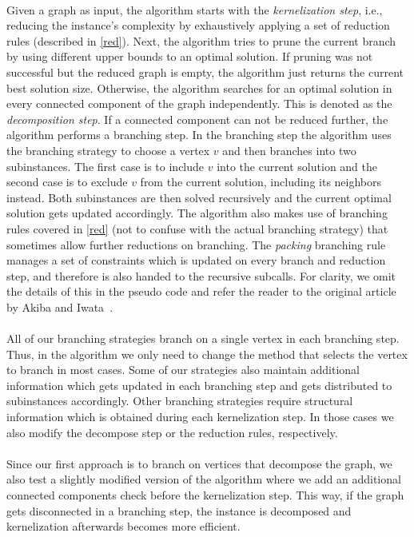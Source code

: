 \documentclass[12pt,a4paper,twoside]{scrartcl}
\numberwithin{equation}{section}
\begin{document}
\paragraph{}
Given a graph as input, the algorithm starts with the \emph{kernelization step}, i.e., reducing the instance's complexity by exhaustively applying a set of reduction rules (described in \ref{red}). Next, the algorithm tries to prune the current branch by using different upper bounds to an optimal solution. If pruning was not successful but the reduced graph is empty, the algorithm just returns the current best solution size. Otherwise, the algorithm searches for an optimal solution in every connected component of the graph independently. This is denoted as the \emph{decomposition step}. If a connected component can not be reduced further, the algorithm performs a branching step. In the branching step the algorithm uses the branching strategy to choose a vertex $v$ and then branches into two subinstances. The first case is to include $v$ into the current solution and the second case is to exclude $v$ from the current solution, including its neighbors instead. Both subinstances are then solved recursively and the current optimal solution gets updated accordingly. The algorithm also makes use of branching rules covered in \ref{red} (not to confuse with the actual branching strategy) that sometimes allow further reductions on branching. The \textit{packing} branching rule manages a set of constraints which is updated on every branch and reduction step, and therefore is also handed to the recursive subcalls. For clarity, we omit the details of this in the pseudo code and refer the reader to the original article by Akiba and Iwata~\cite{AkibaIwata}. \paragraph{}  
All of our branching strategies branch on a single vertex in each branching step. Thus, in the algorithm we only need to change the method that selects the vertex to branch in most cases. Some of our strategies also maintain additional information which gets updated in each branching step and gets distributed to subinstances accordingly. Other branching strategies require structural information which is obtained during each kernelization step. In those cases we also modify the decompose step or the reduction rules, respectively. \paragraph{}
Since our first approach is to branch on vertices that decompose the graph, we also test a slightly modified version of the algorithm where we add an additional connected components check before the kernelization step. This way, if the graph gets disconnected in a branching step, the instance is decomposed and kernelization afterwards becomes more efficient.
\end{document}
